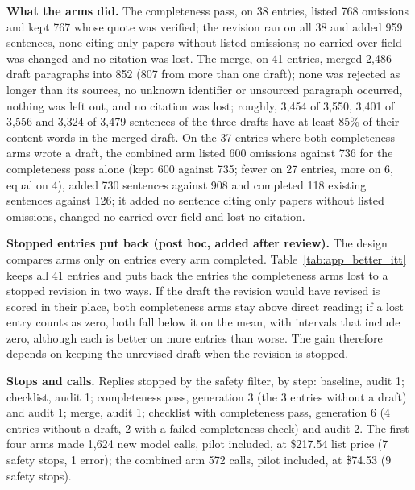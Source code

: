 \documentclass{article} %
\begin{document}
\textbf{What the arms did.} The completeness pass, on 38 entries, listed 768 omissions and kept 767 whose quote was verified; the revision ran on all 38 and added 959 sentences, none citing only papers without listed omissions; no carried-over field was changed and no citation was lost. The merge, on 41 entries, merged 2,486 draft paragraphs into 852 (807 from more than one draft); none was rejected as longer than its sources, no unknown identifier or unsourced paragraph occurred, nothing was left out, and no citation was lost; roughly, 3,454 of 3,550, 3,401 of 3,556 and 3,324 of 3,479 sentences of the three drafts have at least 85\% of their content words in the merged draft. On the 37 entries where both completeness arms wrote a draft, the combined arm listed 600 omissions against 736 for the completeness pass alone (kept 600 against 735; fewer on 27 entries, more on 6, equal on 4), added 730 sentences against 908 and completed 118 existing sentences against 126; it added no sentence citing only papers without listed omissions, changed no carried-over field and lost no citation.

\textbf{Stopped entries put back (post hoc, added after review).} The design compares arms only on entries every arm completed. Table~\ref{tab:app_better_itt} keeps all 41 entries and puts back the entries the completeness arms lost to a stopped revision in two ways. If the draft the revision would have revised is scored in their place, both completeness arms stay above direct reading; if a lost entry counts as zero, both fall below it on the mean, with intervals that include zero, although each is better on more entries than worse. The gain therefore depends on keeping the unrevised draft when the revision is stopped.

\textbf{Stops and calls.} Replies stopped by the safety filter, by step: baseline, audit 1; checklist, audit 1; completeness pass, generation 3 (the 3 entries without a draft) and audit 1; merge, audit 1; checklist with completeness pass, generation 6 (4 entries without a draft, 2 with a failed completeness check) and audit 2. The first four arms made 1,624 new model calls, pilot included, at \$217.54 list price (7 safety stops, 1 error); the combined arm 572 calls, pilot included, at \$74.53 (9 safety stops).
\end{document}
